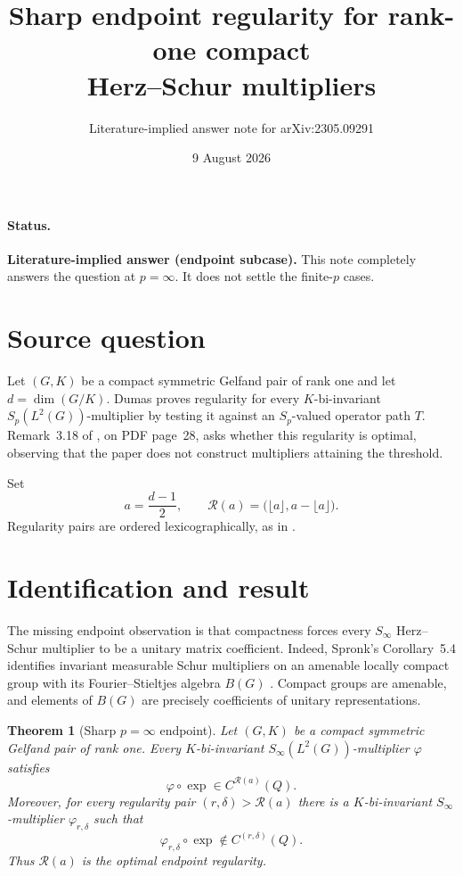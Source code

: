 \documentclass[11pt]{article}
\title{Sharp endpoint regularity for rank-one compact\\
Herz--Schur multipliers}
\author{Literature-implied answer note for arXiv:2305.09291}
\date{9 August 2026}
\newtheorem{theorem}{Theorem}
\begin{document}
\maketitle

\paragraph{Status.}
\textbf{Literature-implied answer (endpoint subcase).}
This note completely answers the question at $p=\infty$.  It does not settle
the finite-$p$ cases.

\section*{Source question}
Let $(G,K)$ be a compact symmetric Gelfand pair of rank one and let
$d=\dim(G/K)$.  Dumas proves regularity for every $K$-bi-invariant
$S_p(L^2(G))$-multiplier by testing it against an $S_p$-valued operator path
$T$.  Remark~3.18 of \cite{Dumas}, on PDF page~28, asks whether this
regularity is optimal, observing that the paper does not construct
multipliers attaining the threshold.

Set
\[
 a=\frac{d-1}{2},\qquad
 \mathcal R(a)=\bigl(\lfloor a\rfloor,a-\lfloor a\rfloor\bigr).
\]
Regularity pairs are ordered lexicographically, as in \cite{Dumas}.

\section*{Identification and result}
The missing endpoint observation is that compactness forces every
$S_\infty$ Herz--Schur multiplier to be a unitary matrix coefficient.
Indeed, Spronk's Corollary~5.4 identifies invariant measurable Schur
multipliers on an amenable locally compact group with its
Fourier--Stieltjes algebra $B(G)$ \cite{Spronk}.  Compact groups are amenable,
and elements of $B(G)$ are precisely coefficients of unitary
representations.

\begin{theorem}[Sharp $p=\infty$ endpoint]
Let $(G,K)$ be a compact symmetric Gelfand pair of rank one.  Every
$K$-bi-invariant $S_\infty(L^2(G))$-multiplier $\varphi$ satisfies
\[
 \varphi\circ\exp\in C^{\mathcal R(a)}(Q).
\]
Moreover, for every regularity pair $(r,\delta)>\mathcal R(a)$ there is a
$K$-bi-invariant $S_\infty$-multiplier $\varphi_{r,\delta}$ such that
\[
 \varphi_{r,\delta}\circ\exp\notin C^{(r,\delta)}(Q).
\]
Thus $\mathcal R(a)$ is the optimal endpoint regularity.
\end{theorem}
\end{document}

